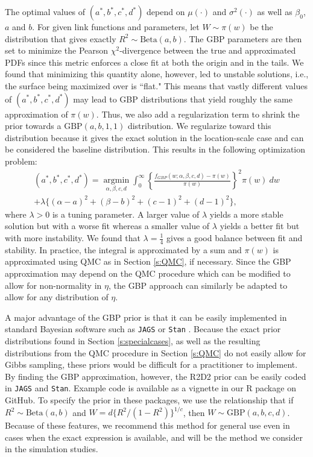 \documentclass[12pt]{article}
\begin{document}
The optimal values of $(a^*, b^*, c^*, d^*)$ depend on $\mu(\cdot)$ and $\sigma^2(\cdot)$ as well as $\beta_0$, $a$ and $b$.  For given link functions and parameters, let $W\sim \pi(w)$ be the distribution that gives exactly $R^2\sim\mbox{Beta}(a,b)$. The GBP parameters are then set to minimize the Pearson $\chi^2$-divergence \citep{renyi1961} between the true and approximated PDFs since this metric enforces a close fit at both the origin and in the tails. We found that minimizing this quantity alone, however, led to unstable solutions, i.e., the surface being maximized over is ``flat." This means that vastly different values of $(a^*,b^*,c^*,d^*)$ may lead to GBP distributions that yield roughly the same approximation of $\pi(w)$. Thus, we also add a regularization term to shrink the prior towards a $\mbox{GBP}(a,b,1,1)$ distribution. We regularize toward this distribution because it gives the exact solution in the location-scale case and can be considered the baseline distribution. This results in the following optimization problem:
\begin{multline}\label{eq:opt}
    (a^*,b^*,c^*,d^*)
    =\underset{\alpha,\beta,c,d}{\operatorname{argmin}}\int_{0}^\infty \left\{\frac{f_{GBP}(w;\alpha,\beta,c,d)-\pi(w)}{\pi(w)}\right\}^2\pi(w)\ dw \\+ \lambda \{(\alpha-a)^2+(\beta-b)^2+(c-1)^2+(d-1)^2\},
\end{multline}
where $\lambda>0$ is a tuning parameter. A larger value of $\lambda$ yields a more stable solution but with a worse fit whereas a smaller value of $\lambda$ yields a better fit but with more instability. We found that $\lambda=\frac14$ gives a good balance between fit and stability. In practice, the integral is approximated by a sum and $\pi(w)$ is approximated using QMC as in Section \ref{s:QMC}, if necessary.  Since the GBP approximation may depend on the QMC procedure which can be modified to allow for non-normality in $\eta$, the GBP approach can similarly be adapted to allow for any distribution of $\eta$.

A major advantage of the GBP prior is that it can be easily implemented in standard Bayesian software such as {\tt JAGS} \citep{plummer2016} or {\tt Stan} \citep{carpenter2017}. Because the exact prior distributions found in Section \ref{s:specialcases}, as well as the resulting distributions from the QMC procedure in Section \ref{s:QMC} do not easily allow for Gibbs sampling, these priors would be difficult for a practitioner to implement. By finding the GBP approximation, however, the R2D2 prior can be easily coded in {\tt JAGS} and {\tt Stan}. Example code is available as a vignette in our R package on GitHub. To specify the prior in these packages, we use the relationship that if $R^2\sim\mbox{Beta}(a,b)$ and $W=d\{R^2/(1-R^2)\}^{1/c}$, then $W\sim\mbox{GBP}(a,b,c,d)$. Because of these features, we recommend this method for general use even in cases when the exact expression is available, and will be the method we consider in the simulation studies.
\end{document}
